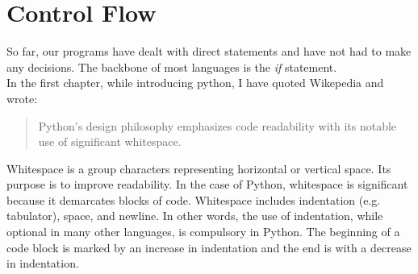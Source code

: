 \chapter{Control Flow}
So far, our programs have dealt with direct statements and have not had to make any decisions. The backbone of most languages is the \emph{if} statement.\\ 
In the first chapter, while introducing python, I have quoted Wikepedia and wrote:
\begin{quote}
Python's design philosophy emphasizes code readability with its notable use of significant whitespace.
\end{quote}
Whitespace is a group characters representing horizontal or vertical space. Its purpose is to improve readability. In the case of Python, whitespace is significant because it demarcates blocks of code. Whitespace includes indentation (e.g. tabulator), space, and newline. In other words, the use of indentation, while optional in many other languages, is compulsory in Python. 
The beginning of a code block is marked by an increase in indentation and the end is with a decrease in indentation.
